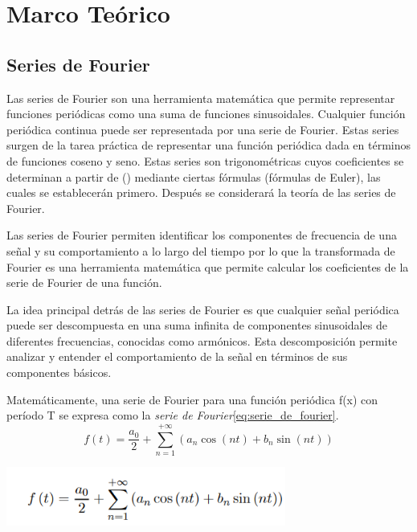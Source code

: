 \section{\texorpdfstring{Marco Teórico }{Marco Teórico }}\label{marco-teuxf3rico}

\subsection{Series de Fourier}\label{series-de-fourier}

Las series de Fourier son una herramienta matemática que permite representar funciones periódicas como una suma de funciones sinusoidales. Cualquier función periódica continua puede ser representada por una serie de Fourier. Estas series surgen de la tarea práctica de representar una función periódica dada en términos de funciones coseno y seno. Estas series son trigonométricas cuyos coeficientes se determinan a partir de () mediante ciertas fórmulas (fórmulas de Euler), las cuales se establecerán primero. Después se considerará la teoría de las series de Fourier.

Las series de Fourier permiten identificar los componentes de frecuencia de una señal y su comportamiento a lo largo del tiempo por lo que la transformada de Fourier es una herramienta matemática que permite calcular los coeficientes de la serie de Fourier de una función.

La idea principal detrás de las series de Fourier es que cualquier señal periódica puede ser descompuesta en una suma infinita de componentes sinusoidales de diferentes frecuencias, conocidas como armónicos. Esta descomposición permite analizar y entender el comportamiento de la señal en términos de sus componentes básicos.

Matemáticamente, una serie de Fourier para una función periódica f(x) con período T se expresa como la \emph{serie de Fourier}\eqref{eq:serie_de_fourier}.
\begin{equation}
	f(t) = \frac{a_0}{2} + \sum_{n=1}^{+\infty} (a_n \cos(nt) + b_n \sin(nt))	
	\label{eq:serie_de_fourier}
\end{equation}


\includegraphics[width=3.61614in,height=0.76218in]{media/image20.png}\cite*{unknown-author-no-dateK}

